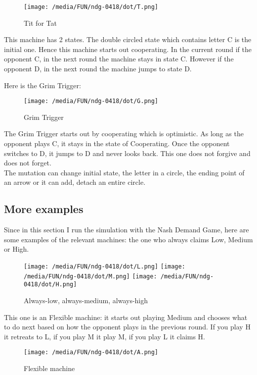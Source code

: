 \documentclass[12.5pt]{report}
\begin{document}
\begin{figure}[h!]
\center
\texttt{[image: /media/FUN/ndg-0418/dot/T.png]}
\caption{Tit for Tat}
\end{figure}

This machine has 2 states. The double circled state which contains letter C is the initial one. Hence this machine starts out cooperating. In the current round if the opponent C, in the next round the machine stays in state C. However if the opponent D, in the next round the machine jumps to state D.

Here is the Grim Trigger:

\begin{figure}[h!]
\center
\texttt{[image: /media/FUN/ndg-0418/dot/G.png]}
\caption{Grim Trigger}
\end{figure}

The Grim Trigger starts out by cooperating which is optimistic. As long as the opponent plays C, it stays in the state of Cooperating. Once the opponent switches to D, it jumps to D and never looks back. This one does not forgive and does not forget.\\

The mutation can change initial state, the letter in a circle, the ending point of an arrow or it can add, detach an entire circle.

\subsection{More examples}

Since in this section I run the simulation with the Nash Demand Game, here are some examples of the relevant machines: the one who always claims Low, Medium or High.

\begin{figure}[h!]
\center
\texttt{[image: /media/FUN/ndg-0418/dot/L.png]}
\texttt{[image: /media/FUN/ndg-0418/dot/M.png]}
\texttt{[image: /media/FUN/ndg-0418/dot/H.png]}
\caption{Always-low, always-medium, always-high}
\end{figure}

This one is an Flexible machine: it starts out playing Medium and chooses what to do next based on how the opponent plays in the previous round. If you play H it retreats to L, if you play M it play M, if you play L it claims H.

\begin{figure}[h!]
\center
\texttt{[image: /media/FUN/ndg-0418/dot/A.png]}
\caption{Flexible machine}
\end{figure}
\end{document}
